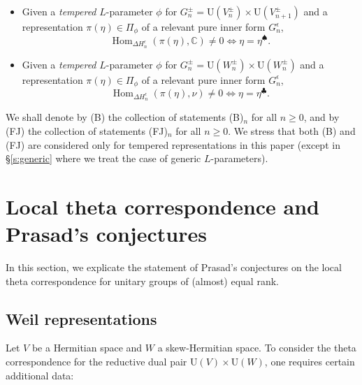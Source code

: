 \documentclass[11pt]{amsart}
\numberwithin{equation}{section}
\theoremstyle{plain}
\theoremstyle{definition}
\theoremstyle{remark}
\def\Hom{\operatorname{Hom}}
\def\U{\mathrm{U}}
\def\CC{\mathbb{C}}
\begin{document}
\begin{itemize}

\item[(B)$_n$]
Given a \emph{tempered} $L$-parameter $\phi$ for $G_n^\pm = \U(V_n^\pm) \times \U(V_{n+1}^\pm)$ and a representation $\pi(\eta) \in \Pi_{\phi}$ of a relevant pure inner form $G_n^\epsilon$,
\[  \Hom_{\Delta H_n^\epsilon}(\pi(\eta), \CC) \ne 0 \Longleftrightarrow  \eta = \eta^{\spadesuit}. \]

\item[(FJ)$_n$]
Given a \emph{tempered} $L$-parameter $\phi$ for $G_n^\pm = \U(W_n^\pm) \times \U(W_n^\pm)$ and a representation $\pi(\eta) \in \Pi_{\phi}$ of a relevant pure inner form $G_n^\epsilon$, 
\[ \Hom_{\Delta H_n^\epsilon}(\pi(\eta), \nu) \ne 0 \Longleftrightarrow \eta = \eta^{\clubsuit}. \]

\end{itemize}

We shall denote by (B) the collection of statements (B)$_n$ for all $n \ge 0$, and by (FJ) the collection of statements (FJ)$_n$ for all $n \ge 0$.
We stress that both (B) and (FJ) are considered only for tempered representations in this paper (except in \S \ref{s:generic} where we treat the case of generic $L$-parameters).

\section{\textbf{Local theta correspondence and Prasad's conjectures}}
\label{S:Pconj}

In this section, we explicate the statement of Prasad's conjectures on the local theta correspondence for unitary groups of (almost) equal rank.

\subsection{Weil representations}
\label{SS:Weil}

Let $V$ be a Hermitian space and $W$ a skew-Hermitian space. To consider the theta correspondence for the reductive dual pair $\U(V) \times \U(W)$, one requires certain additional data:
\end{document}
